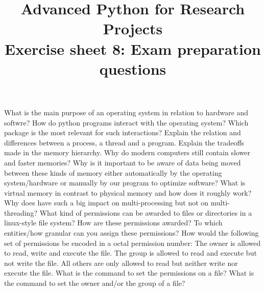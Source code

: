 \documentclass[]{erlangen-problemset}
\title{{\Large Advanced Python for Research Projects} \\[0.3cm] 
Exercise sheet 8: Exam preparation questions }
\begin{document}

\begin{problem}[title={Operating system principles}]
\noindent
\Question What is the main purpose of an operating system in relation to hardware and softwre?
\Question How do python programs interact with the operating system? Which package is the most relevant for such interactions?
\Question Explain the relation and differences between a process, a thread and a program. 
\Question Explain the tradeoffs made in the memory hierarchy. Why do modern computers still contain slower and faster memories?
 Why is it important to be aware of data being moved between these kinds of memory either automatically by the operating system/hardware or manually by our program to optimize software?
\Question What is virtual memory in contrast to physical memory and how does it roughly work? Why does have such a big impact on multi-processing but not on multi-threading?
\Question What kind of permissions can be awarded to files or directories in a linux-style file system? How are these permissions awarded? To which entities/how granular can you assign these permissions?
\Question How would the following set of permissions be encoded in a octal permission number: The owner is allowed to read, write and execute the file. The group is allowed to read and execute but not write the file. All others are only allowed to read but neither write nor execute the file.
\Question What is the command to set the permissions on a file? What is the command to set the owner and/or the group of a file?
\end{problem}
\end{document}
